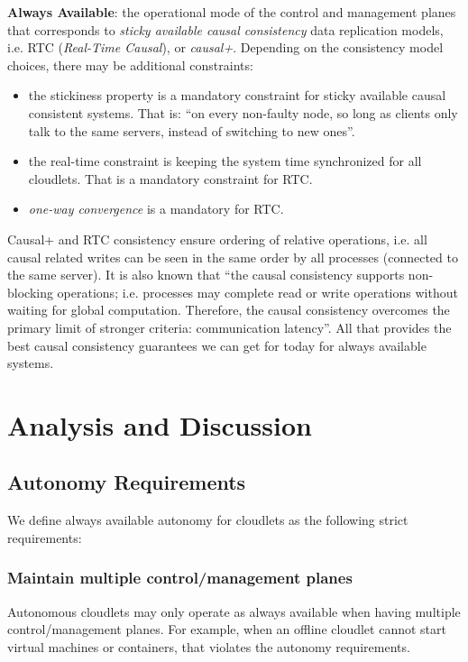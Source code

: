 \documentclass[conference]{IEEEtran}
\begin{document}
\textbf{Always Available}: the operational mode of the control and management
planes that corresponds to \textit{sticky available causal
consistency}\cite{b4} data replication models, i.e. RTC (\textit{Real-Time
Causal}\cite{b2}), or \textit{causal+}\cite{b1}. Depending on the consistency
model choices, there may be additional constraints:
\begin{itemize}
  \item the stickiness property is a mandatory constraint for sticky available
    causal consistent systems. That is: ``on every non-faulty node, so long
    as clients only talk to the same servers, instead of switching to new
    ones''\cite{b4}.
  \item the real-time constraint is keeping the system time synchronized for
    all cloudlets. That is a mandatory constraint for RTC.
  \item \textit{one-way convergence}\cite{b2} is a mandatory for RTC.
\end{itemize}
Causal+ and RTC consistency ensure ordering of relative operations, i.e. all
causal related writes can be seen in the same order by all processes (connected
to the same server). It is also known that ``the causal consistency supports
non-blocking operations; i.e. processes may complete read or write operations
without waiting for global computation. Therefore, the causal consistency
overcomes the primary limit of stronger criteria: communication
latency''\cite{b6}. All that provides the best causal consistency guarantees we
can get for today for always available systems.

\section{Analysis and Discussion}
\subsection{Autonomy Requirements}
We define always available autonomy for cloudlets as the following strict
requirements:

\subsubsection{Maintain multiple control/management planes}
Autonomous cloudlets may only operate as always available when having multiple
control/management planes. For example, when an offline cloudlet cannot start
virtual machines or containers, that violates the autonomy requirements.
\end{document}
